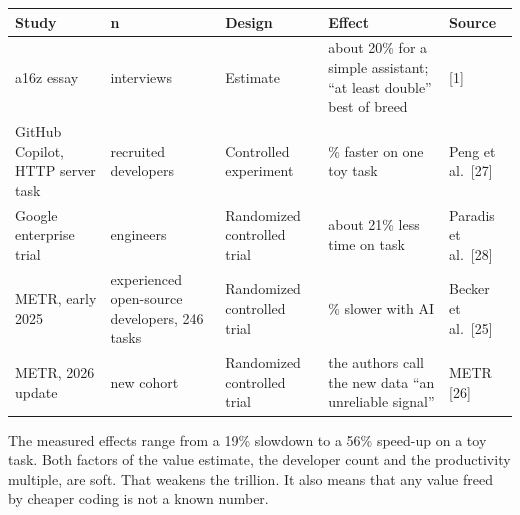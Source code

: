 \documentclass[
  10pt,
]{article}
\newcounter{none} %
\begin{document}
{\def\LTcaptype{none} %
\begin{longtable}[]{@{}
  >{\raggedright\arraybackslash}p{}
  >{\raggedright\arraybackslash}p{}
  >{\raggedright\arraybackslash}p{}
  >{\raggedright\arraybackslash}p{}
  >{\raggedright\arraybackslash}p{}@{}}
\toprule\noalign{}
\begin{minipage}[b]{\linewidth}\raggedright
Study
\end{minipage} & \begin{minipage}[b]{\linewidth}\raggedright
n
\end{minipage} & \begin{minipage}[b]{\linewidth}\raggedright
Design
\end{minipage} & \begin{minipage}[b]{\linewidth}\raggedright
Effect
\end{minipage} & \begin{minipage}[b]{\linewidth}\raggedright
Source
\end{minipage} \\
\midrule\noalign{}
\endhead
\bottomrule\noalign{}
\endlastfoot
a16z essay & interviews & Estimate & about 20\% for a simple assistant;
``at least double'' best of breed & {[}1{]} \\
GitHub Copilot, HTTP server task & recruited developers & Controlled
experiment & 55.8\% faster on one toy task & Peng et al.~{[}27{]} \\
Google enterprise trial & 96 engineers & Randomized controlled trial &
about 21\% less time on task & Paradis et al.~{[}28{]} \\
METR, early 2025 & 16 experienced open-source developers, 246 tasks &
Randomized controlled trial & 19\% slower with AI & Becker et
al.~{[}25{]} \\
METR, 2026 update & new cohort & Randomized controlled trial & the
authors call the new data ``an unreliable signal'' & METR {[}26{]} \\
\end{longtable}
}

The measured effects range from a 19\% slowdown to a 56\% speed-up on a
toy task. Both factors of the value estimate, the developer count and
the productivity multiple, are soft. That weakens the trillion. It also
means that any value freed by cheaper coding is not a known number.
\end{document}
